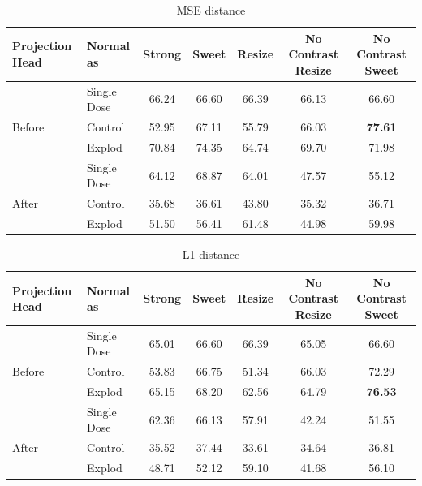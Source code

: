 \begin{table}[H]
  \centering
  \begin{tabular}{@{}llccccc@{}}
  \toprule
  Projection Head & Normal as       & Strong & Sweet & Resize & No Contrast Resize & No Contrast Sweet \\ \midrule
                  & Single Dose    & 66.24      & 66.60     & 66.39      & 66.13                  & 66.60                 \\
  Before          & Control        & 52.95      & 67.11     & 55.79      & 66.03                  & \textbf{77.61}                 \\
                  & Explod         & 70.84      & 74.35    & 64.74      & 69.70                  & 71.98                 \\ \midrule
                  & Single Dose    & 64.12      & 68.87     & 64.01      & 47.57                  & 55.12                 \\
  After           & Control        & 35.68      & 36.61     & 43.80      & 35.32                  & 36.71                 \\
                  & Explod         & 51.50      & 56.41     & 61.48      & 44.98                  & 59.98                 \\ \bottomrule
  \end{tabular}
  \caption{MSE distance}
  \label{tab:table_label}
\end{table}

\begin{table}[H]
  \centering
  \begin{tabular}{@{}llccccc@{}}
  \toprule
  Projection Head & Normal as       & Strong & Sweet & Resize & No Contrast Resize & No Contrast Sweet \\ \midrule
                  & Single Dose    & 65.01      & 66.60     & 66.39      & 65.05                  & 66.60                 \\
  Before          & Control        & 53.83      & 66.75     &  51.34     & 66.03                  & 72.29                 \\
                  & Explod         & 65.15      & 68.20     & 62.56      & 64.79                  & \textbf{76.53}                 \\ \midrule
                  & Single Dose    & 62.36      & 66.13     & 57.91      & 42.24                  & 51.55                 \\
  After           & Control        & 35.52      & 37.44     & 33.61      & 34.64                  & 36.81                 \\
                  & Explod         & 48.71      & 52.12     & 59.10      & 41.68                  & 56.10                 \\ \bottomrule
  \end{tabular}
  \caption{L1 distance}
  \label{tab:table_label}
\end{table}

